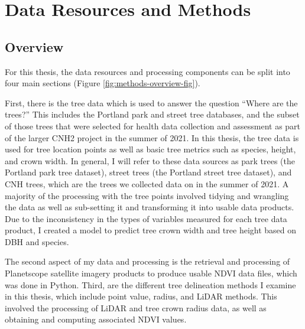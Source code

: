 \documentclass[12pt,twoside]{reedthesis}
\begin{document}
\hypertarget{data-methods}{%
\chapter{Data Resources and Methods}\label{data-methods}}

\hypertarget{overview}{%
\section{Overview}\label{overview}}

For this thesis, the data resources and processing components can be
split into four main sections (Figure \ref{fig:methods-overview-fig}).

First, there is the tree data which is used to answer the question
``Where are the trees?'' This includes the Portland park and street tree
databases, and the subset of those trees that were selected for health
data collection and assessment as part of the larger CNH2 project in the
summer of 2021. In this thesis, the tree data is used for tree location
points as well as basic tree metrics such as species, height, and crown
width. In general, I will refer to these data sources as park trees (the
Portland park tree dataset), street trees (the Portland street tree
dataset), and CNH trees, which are the trees we collected data on in the
summer of 2021. A majority of the processing with the tree points
involved tidying and wrangling the data as well as sub-setting it and
transforming it into usable data products. Due to the inconsistency in
the types of variables measured for each tree data product, I created a
model to predict tree crown width and tree height based on DBH and
species.

The second aspect of my data and processing is the retrieval and
processing of Planetscope satellite imagery products to produce usable
NDVI data files, which was done in Python. Third, are the different tree
delineation methods I examine in this thesis, which include point value,
radius, and LiDAR methods. This involved the processing of LiDAR and
tree crown radius data, as well as obtaining and computing associated
NDVI values.
\end{document}
